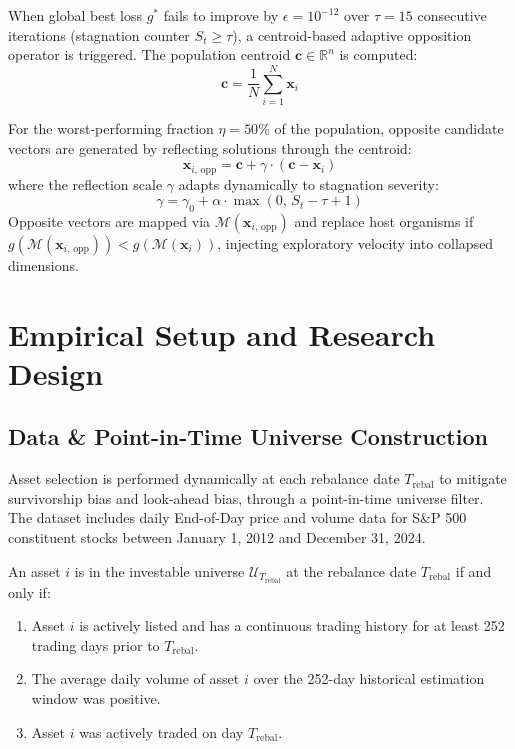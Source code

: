 \documentclass[11pt,a4paper]{article}
\begin{document}
When global best loss $g^*$ fails to improve by $\epsilon = 10^{-12}$ over $\tau = 15$ consecutive iterations (stagnation counter $S_t \ge \tau$), a centroid-based adaptive opposition operator is triggered. The population centroid $\mathbf{c} \in \mathbb{R}^n$ is computed:
\begin{equation}
\mathbf{c} = \frac{1}{N} \sum_{i=1}^N \mathbf{x}_i
\end{equation}

For the worst-performing fraction $\eta = 50\%$ of the population, opposite candidate vectors are generated by reflecting solutions through the centroid:
\begin{equation}
\mathbf{x}_{i, \, \text{opp}} = \mathbf{c} + \gamma \cdot (\mathbf{c} - \mathbf{x}_i)
\end{equation}
where the reflection scale $\gamma$ adapts dynamically to stagnation severity:
\begin{equation}
\gamma = \gamma_0 + \alpha \cdot \max\left(0, \, S_t - \tau + 1\right)
\end{equation}
Opposite vectors are mapped via $\mathcal{M}(\mathbf{x}_{i, \, \text{opp}})$ and replace host organisms if $g(\mathcal{M}(\mathbf{x}_{i, \, \text{opp}})) < g(\mathcal{M}(\mathbf{x}_i))$, injecting exploratory velocity into collapsed dimensions.

\section{Empirical Setup and Research Design}

\subsection{Data \& Point-in-Time Universe Construction}
Asset selection is performed dynamically at each rebalance date $T_{\text{rebal}}$ to mitigate survivorship bias and look-ahead bias, through a point-in-time universe filter. The dataset includes daily End-of-Day price and volume data for S&P 500 constituent stocks between January 1, 2012 and December 31, 2024.

An asset $i$ is in the investable universe $\mathcal{U}_{T_{\text{rebal}}}$ at the rebalance date $T_{\text{rebal}}$ if and only if:
\begin{enumerate} \item Asset $i$ is actively listed and has a continuous trading history for at least 252 trading days prior to $T_{\text{rebal}}$.
    \item The average daily volume of asset $i$ over the 252-day historical estimation window was positive.
    \item Asset $i$ was actively traded on day $T_{\text{rebal}}$. \end{enumerate}
\end{document}
